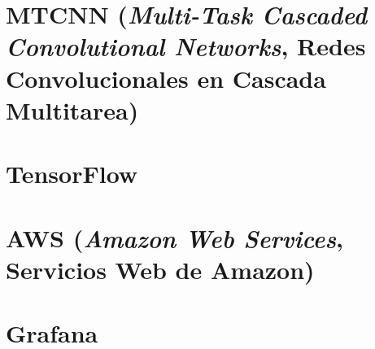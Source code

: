 \section{MTCNN (\textit{Multi-Task Cascaded Convolutional Networks}, Redes Convolucionales en Cascada Multitarea)}

\section{TensorFlow}

\section{AWS (\textit{Amazon Web Services}, Servicios Web de Amazon)}

\section{Grafana}
